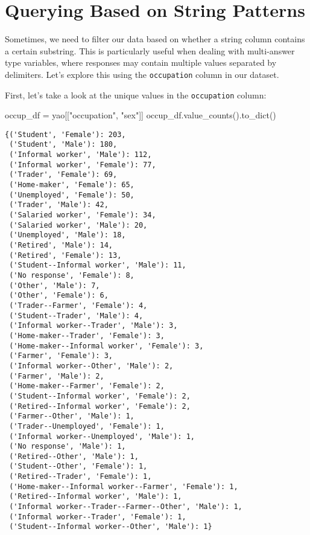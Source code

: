 \documentclass[
  letterpaper,
  DIV=11,
  numbers=noendperiod]{scrreprt}
\newenvironment{Shaded}{\begin{snugshade}}{\end{snugshade}}
\newcommand{\NormalTok}[1]{\textcolor[rgb]{0.00,0.23,0.31}{#1}}
\newcommand{\OperatorTok}[1]{\textcolor[rgb]{0.37,0.37,0.37}{#1}}
\newcommand{\StringTok}[1]{\textcolor[rgb]{0.13,0.47,0.30}{#1}}
\begin{document}
\section{Querying Based on String
Patterns}\label{querying-based-on-string-patterns}

Sometimes, we need to filter our data based on whether a string column
contains a certain substring. This is particularly useful when dealing
with multi-answer type variables, where responses may contain multiple
values separated by delimiters. Let's explore this using the
\texttt{occupation} column in our dataset.

First, let's take a look at the unique values in the \texttt{occupation}
column:

\begin{Shaded}
\begin{Highlighting}[]
\NormalTok{occup\_df }\OperatorTok{=}\NormalTok{ yao[[}\StringTok{"occupation"}\NormalTok{, }\StringTok{"sex"}\NormalTok{]]}
\NormalTok{occup\_df.value\_counts().to\_dict()}
\end{Highlighting}
\end{Shaded}

\begin{verbatim}
{('Student', 'Female'): 203,
 ('Student', 'Male'): 180,
 ('Informal worker', 'Male'): 112,
 ('Informal worker', 'Female'): 77,
 ('Trader', 'Female'): 69,
 ('Home-maker', 'Female'): 65,
 ('Unemployed', 'Female'): 50,
 ('Trader', 'Male'): 42,
 ('Salaried worker', 'Female'): 34,
 ('Salaried worker', 'Male'): 20,
 ('Unemployed', 'Male'): 18,
 ('Retired', 'Male'): 14,
 ('Retired', 'Female'): 13,
 ('Student--Informal worker', 'Male'): 11,
 ('No response', 'Female'): 8,
 ('Other', 'Male'): 7,
 ('Other', 'Female'): 6,
 ('Trader--Farmer', 'Female'): 4,
 ('Student--Trader', 'Male'): 4,
 ('Informal worker--Trader', 'Male'): 3,
 ('Home-maker--Trader', 'Female'): 3,
 ('Home-maker--Informal worker', 'Female'): 3,
 ('Farmer', 'Female'): 3,
 ('Informal worker--Other', 'Male'): 2,
 ('Farmer', 'Male'): 2,
 ('Home-maker--Farmer', 'Female'): 2,
 ('Student--Informal worker', 'Female'): 2,
 ('Retired--Informal worker', 'Female'): 2,
 ('Farmer--Other', 'Male'): 1,
 ('Trader--Unemployed', 'Female'): 1,
 ('Informal worker--Unemployed', 'Male'): 1,
 ('No response', 'Male'): 1,
 ('Retired--Other', 'Male'): 1,
 ('Student--Other', 'Female'): 1,
 ('Retired--Trader', 'Female'): 1,
 ('Home-maker--Informal worker--Farmer', 'Female'): 1,
 ('Retired--Informal worker', 'Male'): 1,
 ('Informal worker--Trader--Farmer--Other', 'Male'): 1,
 ('Informal worker--Trader', 'Female'): 1,
 ('Student--Informal worker--Other', 'Male'): 1}
\end{verbatim}
\end{document}
